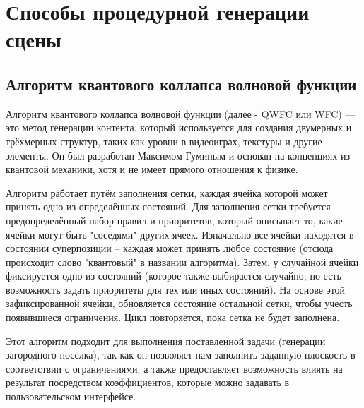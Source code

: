 \section{Способы процедурной генерации сцены}

\subsection*{Алгоритм квантового коллапса волновой функции}

Алгоритм квантового коллапса волновой функции (далее - QWFC или WFC) — это метод генерации контента, который используется для создания двумерных и трёхмерных структур, таких как уровни в видеоиграх, текстуры и другие элементы. Он был разработан Максимом Гуминым и основан на концепциях из квантовой механики, хотя и не имеет прямого отношения к физике. \cite{QWFC}

Алгоритм работает путём заполнения сетки, каждая ячейка которой может принять одно из определённых состояний. Для заполнения сетки требуется предопределённый набор правил и приоритетов, который описывает то, какие ячейки могут быть "соседями" других ячеек. Изначально все ячейки находятся в состоянии суперпозиции -- каждая может принять любое состояние (отсюда происходит слово "квантовый" в названии алгоритма). Затем, у случайной ячейки фиксируется одно из состояний (которое также выбирается случайно, но есть возможность задать приоритеты для тех или иных состояний). На основе этой зафиксированной ячейки, обновляется состояние остальной сетки, чтобы учесть появившиеся ограничения. Цикл повторяется, пока сетка не будет заполнена.

Этот алгоритм подходит для выполнения поставленной задачи (генерации загородного посёлка), так как он позволяет нам заполнить заданную плоскость в соответствии с ограничениями, а также предоставляет возможность влиять на результат посредством коэффициентов, которые можно задавать в пользовательском интерфейсе.

